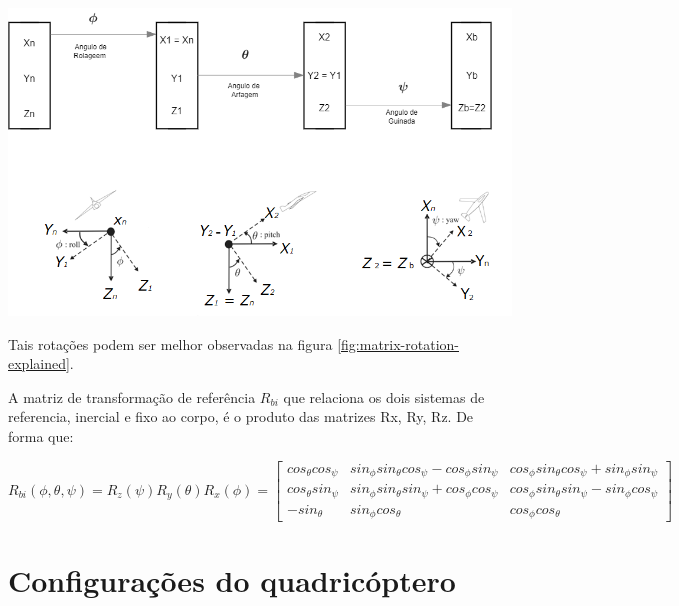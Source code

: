 \includegraphics[width=1\textwidth]{matrix-rotation-explained}


Tais rotações podem ser melhor observadas na figura \ref{fig:matrix-rotation-explained}.

A matriz de transformação de referência  $R_{bi}$ que relaciona os dois sistemas de referencia, inercial e fixo ao corpo, é o produto das matrizes Rx, Ry, Rz. De forma que:


\[
	R_{bi}(\phi,\theta,\psi) = R_z(\psi) R_y(\theta) R_x(\phi) =
	\begin{bmatrix}
		cos_\theta cos_\psi & sin_\phi sin_\theta cos_\psi - cos_\phi sin_\psi & cos_\phi sin_\theta cos_\psi + sin_\phi sin_\psi \\
		cos_\theta sin_\psi & sin_\phi sin_\theta sin_\psi + cos_\phi cos_\psi & cos_\phi sin_\theta sin_\psi - sin_\phi cos_\psi \\
		-sin_\theta         & sin_\phi cos_\theta                              & cos_\phi cos_\theta
	\end{bmatrix}
\]


\section{Configurações do quadricóptero}

